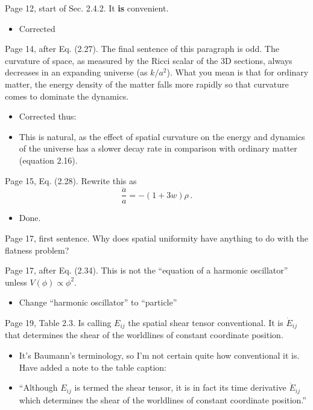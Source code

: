 \documentclass[11pt]{article}
\newcommand{\todo}[1]{{\color{red} #1}}
\begin{document}
\begin{enumerate}
\item Page 12, start of Sec. 2.4.2. It \textbf{is} convenient.
  \begin{itemize}
    \item Corrected
  \end{itemize}
\item Page 14, after Eq. (2.27). The final sentence of this paragraph
  is odd. The curvature of space, as measured by the Ricci scalar of
  the 3D sections, always decreases in an expanding universe (as
  $k/a^2$). What you mean is that for ordinary matter, the energy
  density of the matter falls more rapidly so that curvature comes to
  dominate the dynamics.
  \begin{itemize}
    \item Corrected thus:
    \item This is natural, as the effect of spatial curvature on the energy and dynamics of the universe has a slower decay rate in comparison with ordinary matter (equation 2.16).
  \end{itemize}
\item Page 15, Eq. (2.28). Rewrite this as 
%
\begin{equation}
\frac{\ddot{a}}{a} = - (1+3w) \rho \, . \tag{2.28}
\end{equation}
%
\begin{itemize}
  \item Done.
\end{itemize}
\todo{%
\item Page 17, first sentence. Why does spatial uniformity have
  anything to do with the flatness problem?
}
\item Page 17, after Eq. (2.34). This is not the ``equation of a
  harmonic oscillator'' unless $V(\phi) \propto \phi^2$.
  \begin{itemize}
    \item Change ``harmonic oscillator'' to ``particle''
  \end{itemize}
\item Page 19, Table 2.3. Is calling $E_{ij}$ the spatial shear tensor
  conventional. It is $\dot{E}_{ij}$ that determines the shear of the
  worldlines of constant coordinate position.
  \begin{itemize}
      \item It's Baumann's terminology, so I'm not certain quite how conventional it is. Have added a note to the table caption:
      \item  ``Although \(E_{ij}\) is termed the shear tensor, it is in fact its time derivative \(\dot{E}_{ij}\) which determines the shear of the worldlines of constant coordinate position.''

\end{itemize}
\end{enumerate}
\end{document}
